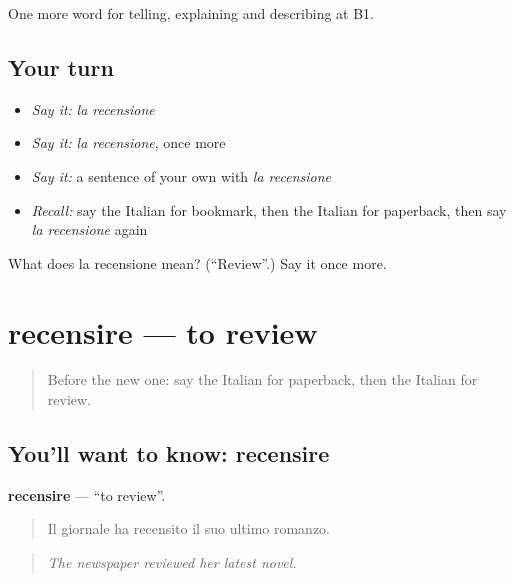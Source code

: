 \begin{grammarlens}[title={What you've built}]
One more word for telling, explaining and describing at B1.
\end{grammarlens}

\subsection*{Your turn}
\begin{itemize}
\raggedright
  \item \emph{Say it:} \emph{la recensione}
  \item \emph{Say it:} \emph{la recensione}, once more
  \item \emph{Say it:} a sentence of your own with \emph{la recensione}
  \item \emph{Recall:} say the Italian for bookmark, then the Italian for paperback, then say \emph{la recensione} again
\end{itemize}

\begin{tcolorbox}[breakable,colback=teal!4,colframe=teal!35!black,title={Before you move on}]
What does la recensione mean? (\textquotedblleft{}Review\textquotedblright{}.) Say it once more.
\end{tcolorbox}
\section[recensire]{recensire — to review}

\label{lesson:IT-C526-recensire}



\begin{quote}
Before the new one: say the Italian for paperback, then the Italian for review.
\end{quote}

\subsection*{You'll want to know: recensire}
\textbf{recensire} — \textquotedblleft{}to review\textquotedblright{}.

\begin{quote}
Il giornale ha recensito il suo ultimo romanzo.
\end{quote}

\begin{quote}
\emph{The newspaper reviewed her latest novel.}
\end{quote}

